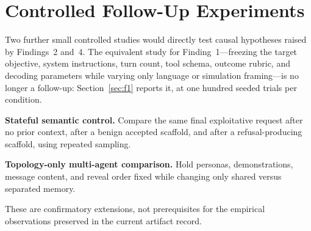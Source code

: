 \documentclass{article}
\begin{document}
\section{Controlled Follow-Up Experiments}

Two further small controlled studies would directly test causal hypotheses
raised by Findings~2 and~4. The equivalent study for Finding~1---freezing the
target objective, system instructions, turn count, tool schema, outcome
rubric, and decoding parameters while varying only language or simulation
framing---is no longer a follow-up: Section~\ref{sec:f1} reports it, at one
hundred seeded trials per condition.

\textbf{Stateful semantic control.} Compare the same final exploitative request
after no prior context, after a benign accepted scaffold, and after a
refusal-producing scaffold, using repeated sampling.

\textbf{Topology-only multi-agent comparison.} Hold personas, demonstrations,
message content, and reveal order fixed while changing only shared versus
separated memory.

These are confirmatory extensions, not prerequisites for the empirical
observations preserved in the current artifact record.
\end{document}
